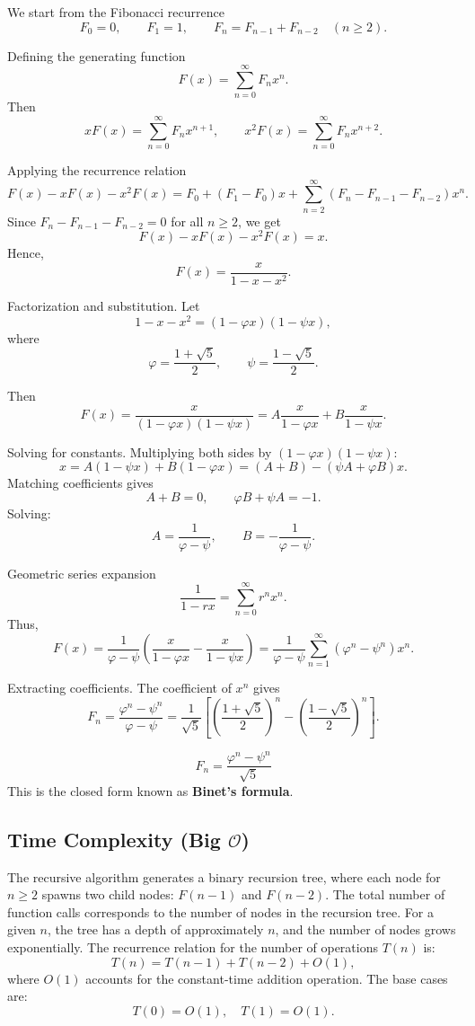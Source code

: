 \documentclass{article}
\begin{document}
We start from the Fibonacci recurrence
\[
F_0 = 0, \qquad F_1 = 1, \qquad F_n = F_{n-1} + F_{n-2} \quad (n \ge 2).
\]

Defining the generating function
\[
F(x) = \sum_{n=0}^{\infty} F_n x^n.
\]
Then
\[
xF(x) = \sum_{n=0}^{\infty} F_n x^{n+1}, \qquad
x^2F(x) = \sum_{n=0}^{\infty} F_n x^{n+2}.
\]

Applying the recurrence relation
\[
F(x) - xF(x) - x^2F(x)
= F_0 + (F_1 - F_0)x + \sum_{n=2}^{\infty}(F_n - F_{n-1} - F_{n-2})x^n.
\]
Since $F_n - F_{n-1} - F_{n-2} = 0$ for all $n \ge 2$, we get
\[
F(x) - xF(x) - x^2F(x) = x.
\]
Hence,
\[
F(x) = \frac{x}{1 - x - x^2}.
\]

Factorization and substitution.
Let
\[
1 - x - x^2 = (1 - \varphi x)(1 - \psi x),
\]
where
\[
\varphi = \frac{1+\sqrt{5}}{2}, \qquad
\psi = \frac{1-\sqrt{5}}{2}.
\]

Then
\[
F(x) = \frac{x}{(1 - \varphi x)(1 - \psi x)}
= A\frac{x}{1 - \varphi x} + B\frac{x}{1 - \psi x}.
\]

Solving for constants.
Multiplying both sides by $(1 - \varphi x)(1 - \psi x)$:
\[
x = A(1 - \psi x) + B(1 - \varphi x)
= (A + B) - (\psi A + \varphi B)x.
\]
Matching coefficients gives
\[
A + B = 0, \qquad \varphi B + \psi A = -1.
\]
Solving:
\[
A = \frac{1}{\varphi - \psi}, \qquad B = -\frac{1}{\varphi - \psi}.
\]

Geometric series expansion
\[
\frac{1}{1 - r x} = \sum_{n=0}^{\infty} r^n x^n.
\]
Thus,
\[
F(x)
= \frac{1}{\varphi - \psi}
\left(
\frac{x}{1 - \varphi x} - \frac{x}{1 - \psi x}
\right)
= \frac{1}{\varphi - \psi}
\sum_{n=1}^{\infty} (\varphi^n - \psi^n)x^n.
\]

Extracting coefficients.
The coefficient of $x^n$ gives
\[
F_n = \frac{\varphi^n - \psi^n}{\varphi - \psi}
= \frac{1}{\sqrt{5}}
\left[
\left(\frac{1+\sqrt{5}}{2}\right)^n
- \left(\frac{1-\sqrt{5}}{2}\right)^n
\right].
\]

\[
\boxed{
	F_n = \frac{\varphi^n - \psi^n}{\sqrt{5}}
}
\]
This is the closed form known as \textbf{Binet's formula}.


\subsection{Time Complexity (Big $\mathcal{O}$)}
The recursive algorithm generates a binary recursion tree, where each node for \( n \geq 2 \) spawns two child nodes: \( F(n-1) \) and \( F(n-2) \).
The total number of function calls corresponds to the number of nodes in the recursion tree. For a given \( n \), the tree has a depth of approximately \( n \), and the number of nodes grows exponentially. The recurrence relation for the number of operations \( T(n) \) is:
\[
T(n) = T(n-1) + T(n-2) + O(1),
\]
where \( O(1) \) accounts for the constant-time addition operation. The base cases are:
\[
T(0) = O(1), \quad T(1) = O(1).
\]
\end{document}
